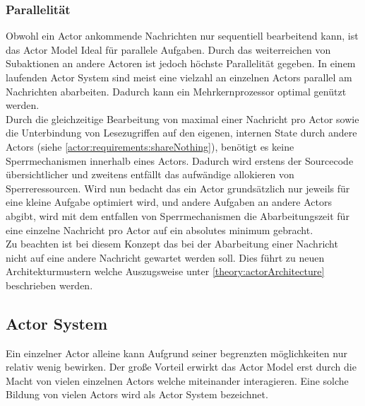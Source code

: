 \subsubsection{Parallelität}\label{actor:parallelism}
Obwohl ein Actor ankommende Nachrichten nur sequentiell bearbeitend kann, ist das Actor Model Ideal für parallele Aufgaben.\citep{hewitt1973session} Durch das weiterreichen von Subaktionen an andere Actoren ist jedoch höchste Parallelität gegeben. In einem laufenden Actor System sind meist eine vielzahl an einzelnen Actors parallel am Nachrichten abarbeiten. Dadurch kann ein Mehrkernprozessor optimal genützt werden. \citep{Agha1985ActorsSystems} \\
Durch die gleichzeitige Bearbeitung von maximal einer Nachricht pro Actor sowie die Unterbindung von Lesezugriffen auf den eigenen, internen State durch andere Actors (siehe \ref{actor:requirements:shareNothing}), benötigt es keine Sperrmechanismen innerhalb eines Actors. Dadurch wird erstens der Sourcecode übersichtlicher und zweitens entfällt das aufwändige allokieren von Sperreressourcen.\citep{Vernon2015ReactiveAkka}
Wird nun bedacht das ein Actor grundsätzlich nur jeweils für eine kleine Aufgabe optimiert wird, und andere Aufgaben an andere Actors abgibt, wird mit dem entfallen von Sperrmechanismen die Abarbeitungszeit für eine einzelne Nachricht pro Actor auf ein absolutes minimum gebracht. \citep{Vernon2015ReactiveAkka} \\
Zu beachten ist bei diesem Konzept das bei der Abarbeitung einer Nachricht nicht auf eine andere Nachricht gewartet werden soll. Dies führt zu neuen Architekturmustern welche Auszugsweise unter \ref{theory:actorArchitecture} beschrieben werden.

\subsection{Actor System}
Ein einzelner Actor alleine kann Aufgrund seiner begrenzten möglichkeiten nur relativ wenig bewirken. Der große Vorteil erwirkt das Actor Model erst durch die Macht von vielen einzelnen Actors welche miteinander interagieren. Eine solche Bildung von vielen Actors wird als Actor System bezeichnet.\citep{Agha1985ActorsSystems}
